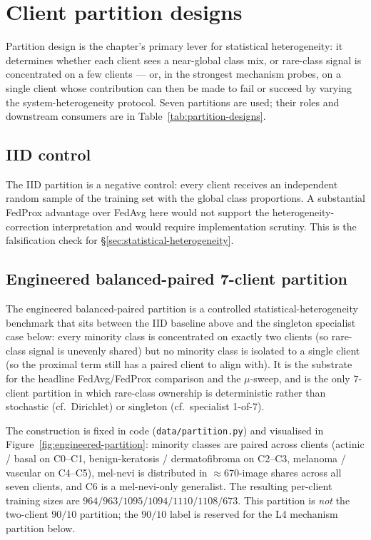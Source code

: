 \documentclass[11pt,a4paper]{report}
\begin{document}
\section{Client partition designs}
\label{sec:method-partitions}

Partition design is the chapter's primary lever for statistical
heterogeneity: it determines whether each client sees a near-global
class mix, or rare-class signal is concentrated on a few clients --- or,
in the strongest mechanism probes, on a single client whose
contribution can then be made to fail or succeed by varying the
system-heterogeneity protocol. Seven partitions are used; their roles
and downstream consumers are in Table~\ref{tab:partition-designs}.

\subsection{IID control}

The IID partition is a negative control: every client receives an
independent random sample of the training set with the global class
proportions. A substantial FedProx advantage over FedAvg here would
not support the heterogeneity-correction interpretation
\citep{li2020fedprox} and would require implementation scrutiny. This
is the falsification check for §\ref{sec:statistical-heterogeneity}.

\subsection{Engineered balanced-paired 7-client partition}

The engineered balanced-paired partition is a controlled
statistical-heterogeneity benchmark that sits between the IID baseline
above and the singleton specialist case below: every minority class is
concentrated on exactly two clients (so rare-class signal is unevenly
shared) but no minority class is isolated to a single client (so the
proximal term still has a paired client to align with). It is the
substrate for the headline FedAvg/FedProx comparison and the
$\mu$-sweep, and is the only $7$-client partition in which rare-class
ownership is deterministic rather than stochastic (cf.\ Dirichlet) or
singleton (cf.\ specialist 1-of-7).

The construction is fixed in code (\texttt{data/partition.py}) and
visualised in Figure~\ref{fig:engineered-partition}: minority classes
are paired across clients (actinic / basal on C0--C1, benign-keratosis
/ dermatofibroma on C2--C3, melanoma / vascular on C4--C5), mel-nevi
is distributed in $\approx 670$-image shares across all seven clients,
and C6 is a mel-nevi-only generalist. The resulting per-client
training sizes are $964 / 963 / 1095 / 1094 / 1110 / 1108 / 673$.
This partition is \emph{not} the two-client $90/10$ partition; the
$90/10$ label is reserved for the L4 mechanism partition below.
\end{document}
